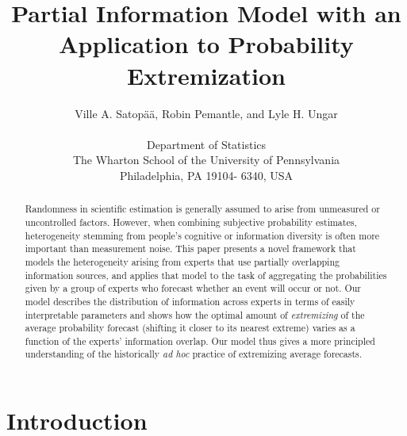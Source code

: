 \documentclass[11pt,twoside]{article}
\theoremstyle{definition}
\theoremstyle{definition}
\begin{document}
\title{Partial Information Model with an Application to Probability Extremization}
\author{
Ville A. Satop\"a\"a, Robin Pemantle, and Lyle H. Ungar\\
\\
 \small Department of Statistics\\
 \small The Wharton School of the University of Pennsylvania\\
 \small Philadelphia, PA 19104- 6340, USA\\ [-0.25in]} \date{}
\maketitle

\pagestyle{myheadings}
\thispagestyle{empty}

\begin{abstract}
Randomness in scientific estimation is generally assumed to arise from
unmeasured or uncontrolled factors. However, when combining subjective probability estimates, heterogeneity
stemming from people's cognitive or information diversity is often
more important than measurement noise.  This paper presents a novel
framework that models the heterogeneity arising
from experts that use partially overlapping information sources, and applies that model to the task of
aggregating the probabilities given by a group of experts who forecast
whether an event will occur or not. Our model describes the
distribution of information across experts in terms of easily
interpretable parameters and shows how the optimal amount
of \textit{extremizing} of the average probability forecast (shifting
it closer to its nearest extreme) varies as a function of the experts'
information overlap.  Our model thus gives a more principled
understanding of the historically {\it ad hoc} practice of extremizing
average forecasts.
\end{abstract}



\section{Introduction}
\end{document}
